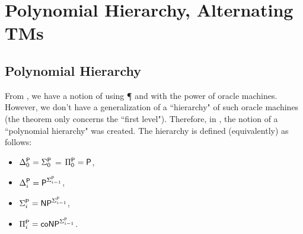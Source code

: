 \section{Polynomial Hierarchy, Alternating TMs}

\subsection{Polynomial Hierarchy}

From , we have a notion of using {\P} and {\NP} with the power of oracle machines. However, we don't have a generalization of a ``hierarchy" of such oracle machines (the theorem only concerns the ``first level"). Therefore, in \cite{originalpolyhierarchypaper}, the notion of a ``polynomial hierarchy" was created. The hierarchy is defined (equivalently) as follows:
\begin{itemize}
\item $\Delta_0^\P = \Sigma_0^\text{\P}$ = $\Pi_0^\text{\P} = \text{\P}$,
\item $\Delta_i^\text{\P} = \text{\P}^{\Sigma_{i-1}^\text{\P}}$, 
\item $\Sigma_i^\text{\P} = \text{\NP}^{\Sigma_{i-1}^\text{\P}}$, 
\item $\Pi_i^\text{\P} = \text{\coNP}^{\Sigma_{i-1}^\text{\P}}$.
\end{itemize}

